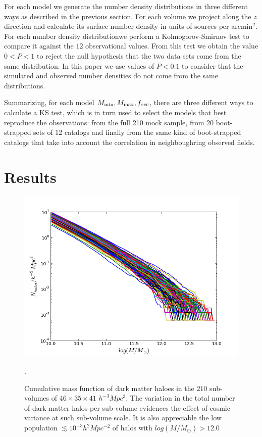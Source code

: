 \documentclass{emulateapj}
\begin{document}
For each model we generate the number density distributions in three different ways as described in the previous section. For each volume we project along the $z$ direction and calculate its surface number density in units of sources per arcmin$^{2}$. For each number density distributionwe perform a Kolmogorov-Smirnov test to compare it against the $12$ observational values. From this test we obtain the value $0<P<1$ to reject the null hypothesis that the two data sets come from the same distribution. In this paper we use values of $P<0.1$ to consider that the simulated and observed number densities do not come from the same distributions.




Summarizing, for each model $M_{\rm min}, M_{\rm max}, f_{\rm occ}$, there are three different ways to calculate a KS test, which is in turn used to select the models that best reproduce the observations: from the full 210 mock sample, from 20 boot-strapped sets of 12 catalogs and finally from the same kind of boot-strapped catalogs that take into account the correlation in neighboughring observed fields.



\section{Results}


\begin{figure}
\begin{center}
\includegraphics[width=1.00\linewidth,angle=0]{./plots/cum_halos_tex.png}
\caption{ \label{figure:laes_dist} Cumulative mass function of dark matter haloes in the $210$ sub-volumes of $46\times 35\times 41$ $h^{-3}Mpc^{3}$. The variation in the total number of dark matter halos per sub-volume  evidences the effect of cosmic variance at such sub-volume scale. It is also appreciable the low population $\lesssim10^{-3}h^{2}Mpc^{-2}$ of halos with $log(M/M_{\odot})>12.0$}.
\end{center} 
\end{figure}
\end{document}
